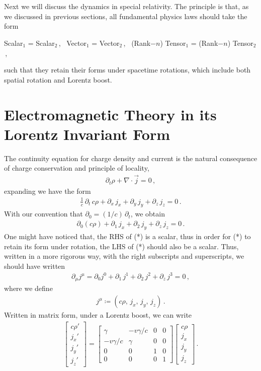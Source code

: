\documentclass[11pt, onesided]{book}
\theoremstyle{break}
\theoremstyle{break}
\newcommand{\pd}{\partial}
\newcommand{\bmat}[1]{\begin{bmatrix} #1 \end{bmatrix}}
\begin{document}
\section[]{}
Next we will discuss the dynamics in special relativity. The principle is that, as we discussed in previous sections, all fundamental physics laws should take the form 
\begin{center}
Scalar$_1$ = Scalar$_2$\,,\ \quad
Vector$_1$ = Vector$_2$\,,\ \quad
(Rank$-n$) Tensor$_1$ = (Rank$-n$) Tensor$_2$\,,
\end{center}
such that they retain their forms under spacetime rotations, which include both spatial rotation and Lorentz boost.\\

\section[Electromagnetic Theory in its Lorentz Invariant Form]{\color{red} Electromagnetic Theory in its Lorentz Invariant Form\color{black}}
The continuity equation for charge density and current is the natural consequence of charge conservation and principle of locality,
\begin{align*}
\pd_t \rho + \nabla \cdot \vec{j} = 0\,,
\end{align*}
expanding we have the form
\begin{align*}
\frac{1}{c}\, \pd_t \, c\rho + \pd_x \,j_x + \pd_y \, j_y + \pd_z \, j_z = 0\,.
\end{align*}
With our convention that $\pd_0 = (1/c)\,\pd_t$, we obtain
\begin{align*}
\pd_0 (c\rho) + \pd_1 \,j_x + \pd_2 \, j_y + \pd_z \, j_z = 0\,.
\tag{*}
\end{align*}
One might have noticed that, the RHS of (*) is a scalar, thus in order for (*) to retain its form under rotation, the LHS of (*) should also be a scalar. Thus, written in a more rigorous way, with the right subscripts and superscripts, we should have written 
\begin{align*}
\pd_\mu j^\mu =\pd_0 j^0 + \pd_1 \,j^1 + \pd_2 \, j^2 + \pd_z \, j^3 = 0\,,
\end{align*}
where we define
\begin{align*}
j^\mu \coloneqq (c\rho,\, j_x,\, j_y , \,j_z)\,.
\end{align*}
Written in matrix form, under a Lorentz boost, we can write
\begin{align*}
\bmat{c\rho'  \\ j_x' \\ j_y' \\ j_z'} = 
\bmat{\gamma & -v\gamma/c & 0 & 0\\
-v\gamma/c & \gamma &0 &0\\
0 &0 &1 &0\\
0 & 0&0 & 1}
\bmat{c\rho  \\ j_x \\ j_y \\ j_z}\,.
\end{align*}
\end{document}
